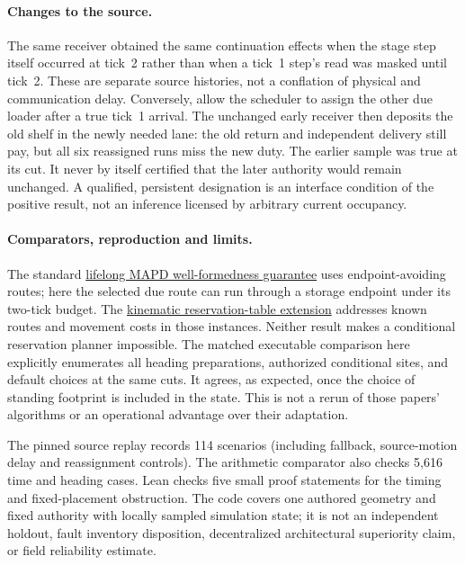 \documentclass[11pt]{article}
\begin{document}
\paragraph{Changes to the source.}
The same receiver obtained the same continuation effects when
the stage step itself occurred at tick~2 rather than when a
tick~1 step's read was masked until tick~2. These are separate
source histories, not a conflation of physical and communication
delay. Conversely, allow the scheduler to assign the other due
loader after a true tick~1 arrival. The unchanged early
receiver then deposits the old shelf in the newly needed lane:
the old return and independent delivery still pay, but all six
reassigned runs miss the new duty. The earlier sample was true
at its cut. It never by itself certified that the later authority
would remain unchanged. A qualified, persistent designation
is an interface condition of the positive result, not an inference
licensed by arbitrary current occupancy.

\paragraph{Comparators, reproduction and limits.}
The standard
\href{https://www2.cs.sfu.ca/~hangma/pub/aamas17.pdf}{lifelong MAPD
well-formedness guarantee} uses endpoint-avoiding routes; here
the selected due route can run through a storage endpoint under
its two-tick budget. The
\href{https://cdn.aaai.org/ojs/4759/4759-13-7798-1-10-20190707.pdf}{kinematic
reservation-table extension} addresses known routes and movement
costs in those instances. Neither result makes a conditional
reservation planner impossible. The matched executable comparison
here explicitly enumerates all heading preparations, authorized
conditional sites, and default choices at the same cuts. It
agrees, as expected, once the choice of standing footprint is
included in the state. This is not a rerun of those papers'
algorithms or an operational advantage over their adaptation.

The pinned source replay records 114 scenarios (including
fallback, source-motion delay and reassignment controls).
The arithmetic comparator also checks 5,616 time and
heading cases. Lean checks five small proof statements for
the timing and fixed-placement obstruction. The code covers
one authored geometry and fixed authority with locally
sampled simulation state; it is not an independent holdout,
fault inventory disposition, decentralized architectural
superiority claim, or field reliability estimate.
\end{document}
